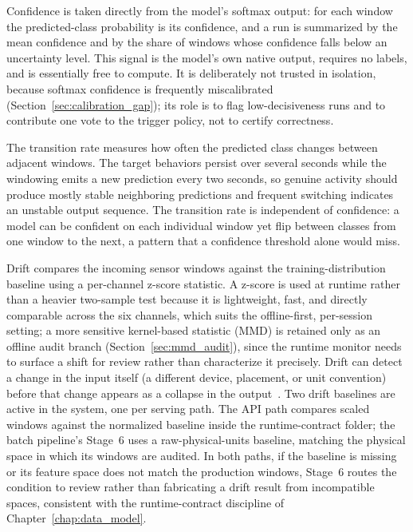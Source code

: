Confidence is taken directly from the model's softmax output: for each window the predicted-class probability is its confidence, and a run is summarized by the mean confidence and by the share of windows whose confidence falls below an uncertainty level. This signal is the model's own native output, requires no labels, and is essentially free to compute. It is deliberately not trusted in isolation, because softmax confidence is frequently miscalibrated (Section~\ref{sec:calibration_gap}); its role is to flag low-decisiveness runs and to contribute one vote to the trigger policy, not to certify correctness.

The transition rate measures how often the predicted class changes between adjacent windows. The target behaviors persist over several seconds while the windowing emits a new prediction every two seconds, so genuine activity should produce mostly stable neighboring predictions and frequent switching indicates an unstable output sequence. The transition rate is independent of confidence: a model can be confident on each individual window yet flip between classes from one window to the next, a pattern that a confidence threshold alone would miss.

Drift compares the incoming sensor windows against the training-distribution baseline using a per-channel z-score statistic. A z-score is used at runtime rather than a heavier two-sample test because it is lightweight, fast, and directly comparable across the six channels, which suits the offline-first, per-session setting; a more sensitive kernel-based statistic (MMD) is retained only as an offline audit branch (Section~\ref{sec:mmd_audit}), since the runtime monitor needs to surface a shift for review rather than characterize it precisely. Drift can detect a change in the input itself (a different device, placement, or unit convention) before that change appears as a collapse in the output~\cite{gama2014survey,webb2016characterizing}. Two drift baselines are active in the system, one per serving path. The API path compares scaled windows against the normalized baseline inside the runtime-contract folder; the batch pipeline's Stage~6 uses a raw-physical-units baseline, matching the physical space in which its windows are audited. In both paths, if the baseline is missing or its feature space does not match the production windows, Stage~6 routes the condition to review rather than fabricating a drift result from incompatible spaces, consistent with the runtime-contract discipline of Chapter~\ref{chap:data_model}.

